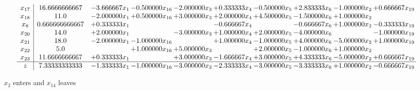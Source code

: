 \documentclass[10pt]{article}
\begin{document}
\[\begin{array}{c| c c@{\hskip 2pt} c@{\hskip 2pt} c@{\hskip 2pt} c@{\hskip 2pt} c@{\hskip 2pt} c@{\hskip 2pt} c@{\hskip 2pt} c@{\hskip 2pt} }
 x_{17}   &  16.6666666667 & -3.666667 x_{1} & -0.500000 x_{16} & -2.000000 x_{3} & + 0.333333 x_{4} & -0.500000 x_{5} & + 2.833333 x_{6} & -1.000000 x_{2} & + 0.666667 x_{19}\\
 x_{18}   &  11.0 & -2.000000 x_{1} & + 0.500000 x_{16} & + 3.000000 x_{3} & + 2.000000 x_{4} & + 4.500000 x_{5} & -1.500000 x_{6} & + 1.000000 x_{2} &   \\
 x_{8}   &  0.666666666667 & + 0.333333 x_{1} &    &   & -0.666667 x_{4} &   & -0.666667 x_{6} & + 1.000000 x_{2} & -0.333333 x_{19}\\
 x_{20}   &  14.0 & + 2.000000 x_{1} &   & -3.000000 x_{3} & + 1.000000 x_{4} & + 2.000000 x_{5} & -4.000000 x_{6} &   & -1.000000 x_{19}\\
 x_{21}   &  18.0 & -2.000000 x_{1} & -1.000000 x_{16} &   & + 1.000000 x_{4} & -1.000000 x_{5} & + 4.000000 x_{6} & -5.000000 x_{2} & + 1.000000 x_{19}\\
 x_{22}   &  5.0  &   & + 1.000000 x_{16} & + 5.000000 x_{3} &   & + 2.000000 x_{5} & -1.000000 x_{6} & + 1.000000 x_{2} &   \\
 x_{23}   &  11.6666666667 & + 0.333333 x_{1} &   & + 3.000000 x_{3} & -1.666667 x_{4} & + 3.000000 x_{5} & + 4.333333 x_{6} & -5.000000 x_{2} & + 0.666667 x_{19}\\
\hline
z    &  7.33333333333 & -1.333333 x_{1} & -1.000000 x_{16} & -3.000000 x_{3} & -2.333333 x_{4} & -3.000000 x_{5} & -3.333333 x_{6} & + 1.000000 x_{2} & -0.666667 x_{19}\\
\end{array}\]


 $ x_{2} $ enters and $ x_{14} $ leaves 
\end{document}
